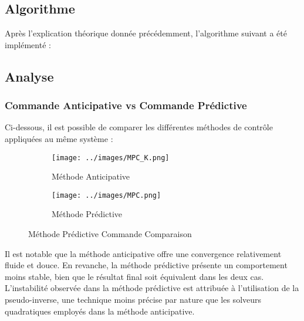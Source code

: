 \documentclass[../CSC_5RO16_TA_TP4.tex]{subfiles}
\begin{document}
\subsection{Algorithme}
\noindent Après l'explication théorique donnée précédemment, l'algorithme suivant a été implémenté :

\begin{scriptsize}\mycode
    
\end{scriptsize}

\newpage\subsection{Analyse}

\subsubsection{Commande Anticipative vs Commande Prédictive}
\noindent Ci-dessous, il est possible de comparer les différentes méthodes de contrôle appliquées au même système :
\begin{figure}[H]
    \centering
    \begin{subfigure}[b]{0.475\textwidth}
        \centering
        \texttt{[image: ../images/MPC\_K.png]}
        \caption{Méthode Anticipative}
        \label{fig:methode_predictive_MPC}
    \end{subfigure}\hfill
    \begin{subfigure}[b]{0.475\textwidth}
        \centering
        \texttt{[image: ../images/MPC.png]}
        \caption{Méthode Prédictive}
        \label{fig:methode_predictive_pseudo_inverse}
    \end{subfigure}
    \caption{Méthode Prédictive Commande Comparaison}
    \label{fig:methode_predictive_comparaison}
\end{figure}
\noindent Il est notable que la méthode anticipative offre une convergence relativement fluide et douce. En revanche, la méthode prédictive présente un comportement moins stable, bien que le résultat final soit équivalent dans les deux cas.\\

\noindent L’instabilité observée dans la méthode prédictive est attribuée à l’utilisation de la pseudo-inverse, une technique moins précise par nature que les solveurs quadratiques employés dans la méthode anticipative.
\end{document}
